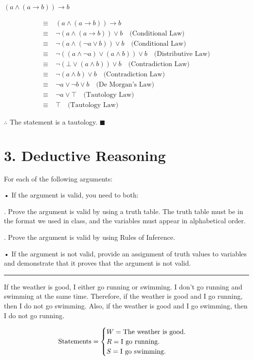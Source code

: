 \documentclass[]{article}
\begin{document}
\begin{question}
    $(a \land (a \rightarrow b)) \rightarrow b$
\end{question}
\begin{align*}
    \equiv\; & (a \land (a \rightarrow b)) \rightarrow b \\
    \equiv\; & \neg(a \land (a \rightarrow b)) \lor b \quad \text{(Conditional Law)} \\
    \equiv\; & \neg(a \land (\neg a \lor b)) \lor b \quad \text{(Conditional Law)} \\
    \equiv\; & \neg((a \land \neg a) \lor (a \land b)) \lor b \quad \text{(Distributive Law)} \\
    \equiv\; & \neg(\bot \lor (a\land b)) \lor b \quad \text{(Contradiction Law)}\\
    \equiv\; &  \neg(a \land b) \lor b \quad \text{(Contradiction Law)} \\
    \equiv\; & \neg a \lor \neg b \lor b \quad \text{(De Morgan's Law)} \\
    \equiv\; & \neg a \lor \top \quad \text{(Tautology Law)} \\
    \equiv\; & \top \quad \text{(Tautology Law)}
\end{align*}
\begin{center}
    $\therefore$ The statement is a tautology. $\blacksquare$
\end{center}
\section*{3. Deductive Reasoning}
For each of the following arguments:

\quad • If the argument is valid, you need to both:

\quad {}. Prove the argument is valid by using a truth table. The truth table must be in the format we used in class, and the variables must appear in alphabetical order.

\quad {}. Prove the argument is valid by using Rules of Inference.



\quad • If the argument is not valid, provide an assignment of truth values to variables and demonstrate that it proves
that the argument is not valid.
\vspace{0.1in}
\hrule
\vspace{0.1in}

\begin{question}
    If the weather is good, I either go running or swimming. I don’t go running and swimming at the same time.
Therefore, if the weather is good and I go running, then I do not go swimming. Also, if the weather is good and
I go swimming, then I do not go running.
\end{question}
\[
    \text{Statements} = \begin{cases}
        W = \text{The weather is good.} \\
        R = \text{I go running.} \\
        S = \text{I go swimming.}
    \end{cases} \\
\]
    
\end{document}
